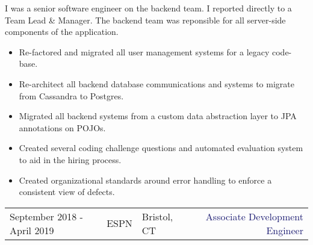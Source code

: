 \documentclass{article}
\begin{document}
\vspace{3pt} I was a senior software engineer on the backend team. I reported directly to a Team Lead \& Manager. The backend team was reponsible for all server-side components of the application. 
\begin{multicols}{2}
  \begin{small}
    \begin{itemize}[leftmargin=*,label=\tiny{$\bullet$}]
    \item\begin{minipage}[t]{\linewidth}{Re-factored and migrated all user management systems for a legacy code-base.}\end{minipage}
    \item\begin{minipage}[t]{\linewidth}{Re-architect all backend database communications and systems to migrate from Cassandra to Postgres.}\end{minipage}
    \item\begin{minipage}[t]{\linewidth}{Migrated all backend systems from a custom data abstraction layer to JPA annotations on POJOs.}\end{minipage}
    \item\begin{minipage}[t]{\linewidth}{Created several coding challenge questions and automated evaluation system to aid in the hiring process.}\end{minipage}
    \item\begin{minipage}[t]{\linewidth}{Created organizational standards around error handling to enforce a consistent view of defects.}\end{minipage}
    \end{itemize}
  \end{small} 
\end{multicols}

\vspace{15pt}\begin{tabularx}{\textwidth}{@{}lllXr}
  September 2018 - April 2019&\textcolor{Mahogany}{ESPN}&\textcolor{Black!80}{Bristol, CT}&&\textcolor{MidnightBlue}{Associate Development Engineer}
\end{tabularx}
\end{document}
